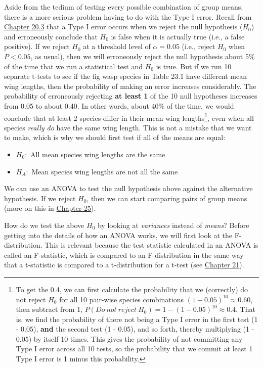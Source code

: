 \documentclass[
]{scrbook}
\providecommand{\tightlist}{%
  \setlength{\itemsep}{0pt}\setlength{\parskip}{0pt}}
\begin{document}
Aside from the tedium of testing every possible combination of group means, there is a more serious problem having to do with the Type I error.
Recall from \protect\hyperlink{p-values-false-positives-and-power}{Chapter 20.3} that a Type I error occurs when we reject the null hypothesis (\(H_{0}\)) and erroneously conclude that \(H_{0}\) is false when it is actually true (i.e., a false positive).
If we reject \(H_{0}\) at a threshold level of \(\alpha = 0.05\) (i.e., reject \(H_{0}\) when \(P < 0.05\), as usual), then we will erroneously reject the null hypothesis about 5\% of the time that we run a statistical test and \(H_{0}\) is true.
But if we run 10 separate t-tests to see if the fig wasp species in Table 23.1 have different mean wing lengths, then the probability of making an error increases considerably.
The probability of erroneously rejecting \textbf{at least 1} of the 10 null hypotheses increases from 0.05 to about 0.40.
In other words, about 40\% of the time, we would conclude that at least 2 species differ in their mean wing lengths\footnote{To get the 0.4, we can first calculate the probability that we (correctly) do not reject \(H_{0}\) for all 10 pair-wise species combinations \((1 - 0.05)^{10} \approx 0.60\), then subtract from 1, \(P(Do\:not\:reject\:H_{0}) = 1 - (1 - 0.05)^{10} \approx 0.4\). That is, we find the probability of there not being a Type I error in the first test (1 - 0.05), \textbf{and} the second test (1 - 0.05), and so forth, thereby multiplying (1 - 0.05) by itself 10 times. This gives the probability of not committing any Type I error across all 10 tests, so the probability that we commit at least 1 Type I error is 1 minus this probability.}, even when all species \emph{really do} have the same wing length.
This is not a mistake that we want to make, which is why we should first test if all of the means are equal:

\begin{itemize}
\tightlist
\item
  \(H_{0}:\) All mean species wing lengths are the same
\item
  \(H_{A}:\) Mean species wing lengths are not all the same
\end{itemize}

We can use an ANOVA to test the null hypothesis above against the alternative hypothesis.
If we reject \(H_{0}\), then we can start comparing pairs of group means (more on this in \protect\hyperlink{Chapter_25}{Chapter 25}).

How do we test the above \(H_{0}\) by looking at \emph{variances} instead of \emph{means}?
Before getting into the details of how an ANOVA works, we will first look at the F-distribution.
This is relevant because the test statistic calculated in an ANOVA is called an F-statistic, which is compared to an F-distribution in the same way that a t-statistic is compared to a t-distribution for a t-test (see \protect\hyperlink{Chapter_21}{Chapter 21}).
\end{document}
